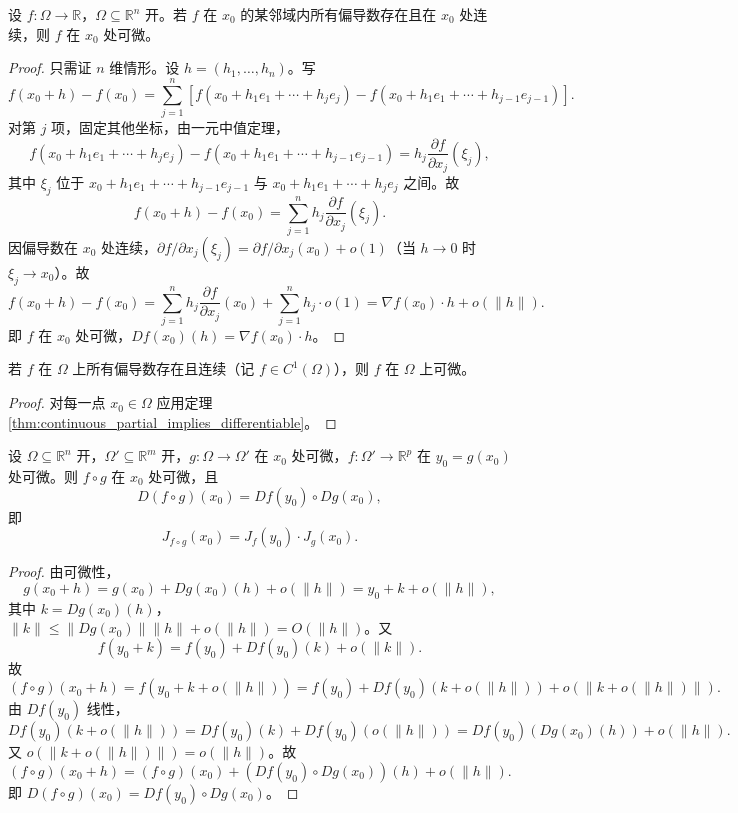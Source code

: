 \begin{theorem}[连续偏导数蕴含可微]\label{thm:continuous_partial_implies_differentiable}
设 $f: \Omega \to \mathbb{R}$，$\Omega \subseteq \mathbb{R}^n$ 开。若 $f$ 在 $x_0$ 的某邻域内所有偏导数存在且在 $x_0$ 处连续，则 $f$ 在 $x_0$ 处可微。
\end{theorem}

\begin{proof}
只需证 $n$ 维情形。设 $h = (h_1, \dots, h_n)$。写
\[
f(x_0 + h) - f(x_0) = \sum_{j=1}^{n} [f(x_0 + h_1 e_1 + \cdots + h_j e_j) - f(x_0 + h_1 e_1 + \cdots + h_{j-1} e_{j-1})].
\]
对第 $j$ 项，固定其他坐标，由一元中值定理，
\[
f(x_0 + h_1 e_1 + \cdots + h_j e_j) - f(x_0 + h_1 e_1 + \cdots + h_{j-1} e_{j-1}) = h_j \frac{\partial f}{\partial x_j}(\xi_j),
\]
其中 $\xi_j$ 位于 $x_0 + h_1 e_1 + \cdots + h_{j-1} e_{j-1}$ 与 $x_0 + h_1 e_1 + \cdots + h_j e_j$ 之间。故
\[
f(x_0 + h) - f(x_0) = \sum_{j=1}^{n} h_j \frac{\partial f}{\partial x_j}(\xi_j).
\]
因偏导数在 $x_0$ 处连续，$\partial f/\partial x_j(\xi_j) = \partial f/\partial x_j(x_0) + o(1)$（当 $h \to 0$ 时 $\xi_j \to x_0$）。故
\[
f(x_0 + h) - f(x_0) = \sum_{j=1}^{n} h_j \frac{\partial f}{\partial x_j}(x_0) + \sum_{j=1}^{n} h_j \cdot o(1) = \nabla f(x_0) \cdot h + o(\|h\|).
\]
即 $f$ 在 $x_0$ 处可微，$Df(x_0)(h) = \nabla f(x_0) \cdot h$。
\end{proof}

\begin{corollary}[$C^1$ 函数可微]\label{cor:c1_differentiable}
若 $f$ 在 $\Omega$ 上所有偏导数存在且连续（记 $f \in C^1(\Omega)$），则 $f$ 在 $\Omega$ 上可微。
\end{corollary}

\begin{proof}
对每一点 $x_0 \in \Omega$ 应用定理 \ref{thm:continuous_partial_implies_differentiable}。
\end{proof}

\begin{theorem}[链式法则]\label{thm:chain_rule_ra}
设 $\Omega \subseteq \mathbb{R}^n$ 开，$\Omega' \subseteq \mathbb{R}^m$ 开，$g: \Omega \to \Omega'$ 在 $x_0$ 处可微，$f: \Omega' \to \mathbb{R}^p$ 在 $y_0 = g(x_0)$ 处可微。则 $f \circ g$ 在 $x_0$ 处可微，且
\[
D(f \circ g)(x_0) = Df(y_0) \circ Dg(x_0),
\]
即
\[
J_{f \circ g}(x_0) = J_f(y_0) \cdot J_g(x_0).
\]
\end{theorem}

\begin{proof}
由可微性，
\[
g(x_0 + h) = g(x_0) + Dg(x_0)(h) + o(\|h\|) = y_0 + k + o(\|h\|),
\]
其中 $k = Dg(x_0)(h)$，$\|k\| \le \|Dg(x_0)\| \|h\| + o(\|h\|) = O(\|h\|)$。又
\[
f(y_0 + k) = f(y_0) + Df(y_0)(k) + o(\|k\|).
\]
故
\[
(f \circ g)(x_0 + h) = f(y_0 + k + o(\|h\|)) = f(y_0) + Df(y_0)(k + o(\|h\|)) + o(\|k + o(\|h\|)\|).
\]
由 $Df(y_0)$ 线性，
\[
Df(y_0)(k + o(\|h\|)) = Df(y_0)(k) + Df(y_0)(o(\|h\|)) = Df(y_0)(Dg(x_0)(h)) + o(\|h\|).
\]
又 $o(\|k + o(\|h\|)\|) = o(\|h\|)$。故
\[
(f \circ g)(x_0 + h) = (f \circ g)(x_0) + (Df(y_0) \circ Dg(x_0))(h) + o(\|h\|).
\]
即 $D(f \circ g)(x_0) = Df(y_0) \circ Dg(x_0)$。
\end{proof}

